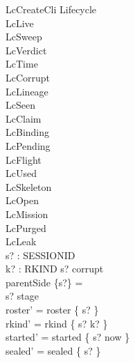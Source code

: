 \documentclass[a4paper,10pt,fleqn]{article}
\begin{document}
\begin{schema}{LcCreateCli}
\Delta Lifecycle \\
\Xi LcLive \\
\Xi LcSweep \\
\Xi LcVerdict \\
\Xi LcTime \\
\Xi LcCorrupt \\
\Xi LcLineage \\
\Xi LcSeen \\
\Xi LcClaim \\
\Xi LcBinding \\
\Xi LcPending \\
\Xi LcFlight \\
\Xi LcUsed \\
\Xi LcSkeleton \\
\Xi LcOpen \\
\Xi LcMission \\
\Xi LcPurged \\
\Xi LcLeak \\
s? : SESSIONID \\
k? : RKIND
\where
s? \notin corrupt \\
parentSide \limg \{s?\} \rimg = \emptyset \\
s? \notin \dom stage \\
roster' = roster \cup \{ s? \} \\
rkind' = rkind \oplus \{ s? \mapsto k? \} \\
started' = started \oplus \{ s? \mapsto now \} \\
sealed' = sealed \oplus \{ s? \mapsto \emptyset \}
\end{schema}
\end{document}
